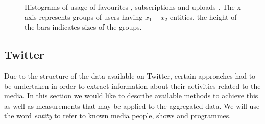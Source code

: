 \begin{figure}[ht]
  \centering
  \label{fig:subfigureExample}
  \caption{Histograms of usage of favourites , subscriptions
   and uploads . The x axis represents groups of
  users having $x_1-x_2$ entities, the height of the bars indicates sizes of the
  groups.}
\end{figure}

\newpage
\subsection{Twitter}

Due to the structure of the data available on Twitter, certain approaches had to be undertaken in order to
extract information about their activities related to the media. In this section we would like to describe
available methods to achieve this as well as measurements that may be applied to the aggregated data.
We will use the word \textit{entity} to refer to known media people, shows and programmes.


